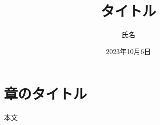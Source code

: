 \documentclass[uplatex,dvipdfmx,a4paper]{jsarticle}
\title{タイトル}
\author{氏名}
\date{2023年10月6日}
\begin{document}
\maketitle

\section{章のタイトル}

本文
\end{document}
